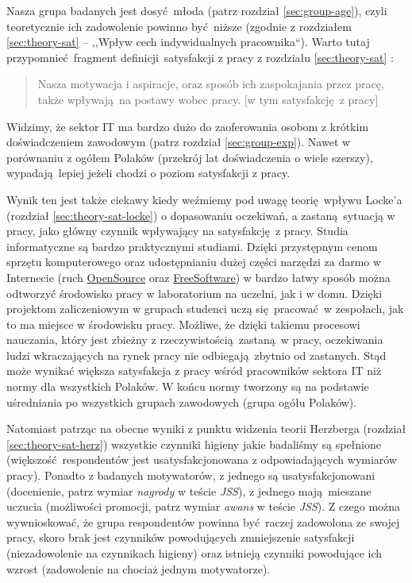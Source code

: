 Nasza grupa badanych jest dosyć młoda (patrz rozdział \ref{sec:group-age}), czyli teoretycznie ich zadowolenie powinno być niższe (zgodnie z rozdziałem \ref{sec:theory-sat} -- ,,Wpływ cech indywidualnych pracownika``). Warto tutaj przypomnieć fragment definicji satysfakcji z pracy z rozdziału \ref{sec:theory-sat} \cite{SchultzSat}:
\begin{quote}
  Nasza motywacja i aspiracje, oraz sposób ich zaspokajania przez pracę, także wpływają na postawy wobec pracy. [w tym satysfakcję z pracy]
\end{quote}
Widzimy, że sektor IT ma bardzo dużo do zaoferowania osobom z krótkim doświadczeniem zawodowym (patrz rozdział \ref{sec:group-exp}). Nawet w porównaniu z ogółem Polaków (przekrój lat doświadczenia o wiele szerszy), wypadają lepiej jeżeli chodzi o poziom satysfakcji z pracy.

Wynik ten jest także ciekawy kiedy weźmiemy pod uwagę teorię wpływu Locke'a (rozdział \ref{sec:theory-sat-locke}) o dopasowaniu oczekiwań, a zastaną sytuacją w pracy, jako główny czynnik wpływający na satysfakcję z pracy. Studia informatyczne są bardzo praktycznymi studiami. Dzięki przystępnym cenom sprzętu komputerowego oraz udostępnianiu dużej części narzędzi za darmo w Internecie (ruch
\href{http://en.wikipedia.org/wiki/Open-source_software}{OpenSource} oraz \href{http://en.wikipedia.org/wiki/Free_software}{FreeSoftware}) w bardzo łatwy sposób można odtworzyć środowisko pracy w laboratorium na uczelni, jak i w domu. Dzięki projektom zaliczeniowym w grupach studenci uczą się pracować w zespołach, jak to ma miejsce w środowisku pracy. Możliwe, że dzięki takiemu procesowi nauczania, który jest zbieżny z rzeczywistością zastaną w pracy, oczekiwania ludzi
wkraczających na rynek pracy nie odbiegają zbytnio od zastanych. Stąd może wynikać większa satysfakcja z pracy wśród pracowników sektora IT niż normy dla wszystkich Polaków. W końcu normy tworzony są na podstawie uśredniania po wszystkich grupach zawodowych (grupa ogółu Polaków).

Natomiast patrząc na obecne wyniki z punktu widzenia teorii Herzberga (rozdział \ref{sec:theory-sat-herz}) wszystkie czynniki higieny jakie badaliśmy są spełnione (większość respondentów jest usatysfakcjonowana z odpowiadających wymiarów pracy). Ponadto z badanych motywatorów, z jednego są usatysfakcjonowani (docenienie, patrz wymiar \textit{nagrody} w teście \emph{JSS}), z jednego mają mieszane uczucia (możliwości promocji, patrz wymiar \textit{awans} w teście \emph{JSS}). Z czego można wywnioskować, że
grupa respondentów powinna być raczej zadowolona ze swojej pracy, skoro brak jest czynników powodujących zmniejszenie satysfakcji (niezadowolenie na czynnikach higieny) oraz istnieją czynniki powodujące ich wzrost (zadowolenie na chociaż jednym motywatorze). 

